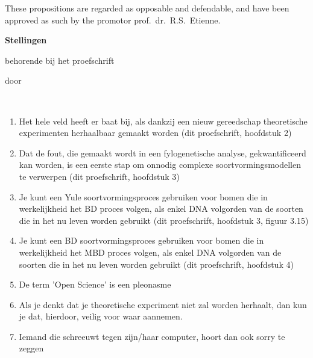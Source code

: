 \documentclass{propositions}
\begin{document}
\bigskip
\bigskip

\begin{center}
These propositions are regarded as opposable and defendable, and have been approved as such by the promotor prof.\ dr.\ R.S.\ Etienne.
\end{center}

\clearpage
{

\begin{center}

{\Large\titlefont\bfseries Stellingen}

\bigskip

behorende bij het proefschrift

\bigskip

{\makeatletter
\titlestyle\bfseries\large\@title
\makeatother}

{\makeatletter
\ifx\@subtitle\undefined\else
    \titlefont\titleshape\@subtitle
\fi
\makeatother}

\bigskip

door

\bigskip

\makeatletter
{\large\titlefont\bfseries\@firstname\ {\titleshape\@lastname}}
\makeatother

\end{center}

\bigskip
\bigskip

\begin{enumerate}
  \item Het hele veld heeft er baat bij, als dankzij een nieuw 
        gereedschap theoretische experimenten herhaalbaar gemaakt worden 
        (dit proefschrift, hoofdstuk 2)
  \item Dat de fout, die gemaakt wordt in een fylogenetische analyse,
        gekwantificeerd kan worden, is een eerste
        stap om onnodig complexe soortvormingsmodellen te verwerpen
        (dit proefschrift, hoofdstuk 3)
  \item Je kunt een Yule soortvormingsproces gebruiken
        voor bomen die in werkelijkheid het BD proces volgen,
        als enkel DNA volgorden van de soorten die in het nu
        leven worden gebruikt 
        (dit proefschrift, hoofdstuk 3, figuur 3.15)
  \item Je kunt een BD soortvormingsproces gebruiken
        voor bomen die in werkelijkheid het MBD proces volgen,
        als enkel DNA volgorden van de soorten die in het nu
        leven worden gebruikt (dit proefschrift, hoofdstuk 4)
  \item De term 'Open Science' is een pleonasme
  \item Als je denkt dat je theoretische experiment niet zal worden herhaalt,
        dan kun je dat, hierdoor, veilig voor waar aannemen.
  \item Iemand die schreeuwt tegen zijn/haar computer, hoort dan ook sorry te zeggen
\end{enumerate}

}
\end{document}
